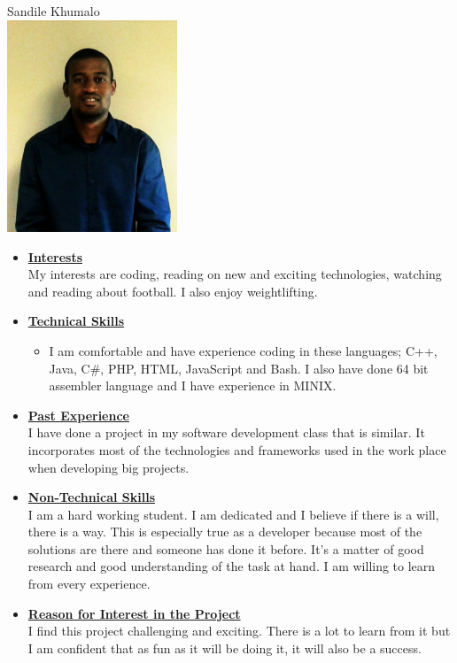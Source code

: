\documentclass[a4paper,12pt]{article}
\begin{document}
\begin{center}
{\Large Sandile {Khumalo}} \\[0.3cm]
\includegraphics[width=2in]{Sandile.jpg}\\[0.4cm] 
\end{center}



\begin{itemize}
\item {\large \underline{\textbf{Interests}}}\\[0.2cm]
My interests are coding, reading on new and exciting technologies, watching and reading about football. I also enjoy weightlifting.


\item {\large \underline{\textbf{Technical Skills}}}

	\begin{itemize}
		\item I am comfortable and have experience coding in these languages; C++, Java, C\#, PHP, HTML, JavaScript and 			Bash. I also have done 64 bit assembler language and I have experience in MINIX.
	\end{itemize}
\bigskip
\item {\large \underline{\textbf{Past Experience}}}\\[0.2cm]
I have done a project in my software development class that is similar. It incorporates  most of the technologies and frameworks used in the work place when developing big projects.
\\
\item {\large \underline{\textbf{Non-Technical Skills}}}\\[0.2cm]
 I am a hard working student. I am dedicated and I believe if there is a will, there is a way. This is especially true as a developer because most of the solutions are there and someone has done it before. It's a matter of good research and good understanding of the task at hand. I am willing to learn from every experience. 
\\
\item {\large \underline{\textbf{Reason for Interest in the Project}}}\\[0.2cm]
I find this project challenging and exciting. There is a lot to learn from it but I am confident that as fun as it will be doing it, it will also be a success.

\end{itemize}
\end{document}
